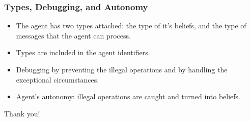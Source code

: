 \documentclass{beamer}
\begin{document}
\begin{frame}[fragile]
\frametitle{Types, Debugging, and Autonomy}
\begin{itemize}
\item
  The agent has two types attached: the type of it's beliefs, and the type of
   messages that the agent can process.
\item
  Types are included in the agent identifiers.
\item
  Debugging by preventing the illegal operations and by handling the 
  exceptional circumstances.
\item
  Agent's autonomy: illegal operations are caught and turned into beliefs.
\end{itemize}
\note[item]{}
\end{frame}

\begin{frame}
\centerline{Thank you!}
\note[item]{}
\end{frame}
\end{document}
